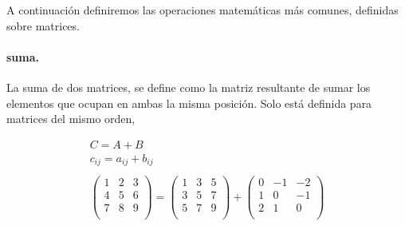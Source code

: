 \begin{paracol}{2}
A continuación definiremos las operaciones matemáticas más comunes, definidas sobre matrices. 

\paragraph{suma.} La suma de dos matrices, se define como la matriz resultante de sumar los elementos que ocupan en ambas la misma posición. Solo está definida para matrices del mismo orden,
\end{paracol}
\begin{gather*}
C=A+B\\
c_{ij}=a_{ij}+b_{ij}\\
\\
\begin{pmatrix}
1& 2& 3\\
4& 5& 6\\
7& 8& 9\\
\end{pmatrix} =
\begin{pmatrix}
1& 3& 5\\
3& 5& 7\\
5& 7& 9\\
\end{pmatrix} +
\begin{pmatrix}
0& -1& -2\\
1& 0& -1\\
2& 1& 0\\
\end{pmatrix}
\end{gather*}
